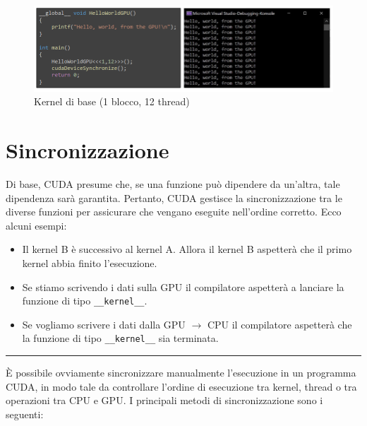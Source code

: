 \documentclass[12pt,a4paper]{report}
\begin{document}
\begin{figure}[h]
    \includegraphics[width=1\linewidth]{img/basic_kernel.png}
    \caption{Kernel di base (1 blocco, 12 thread) \cite{CUDAtutorial}}
\end{figure}

\section{Sincronizzazione}

Di base, CUDA presume che, se una funzione può dipendere da un'altra, tale dipendenza sarà garantita. Pertanto, CUDA gestisce la sincronizzazione tra le diverse funzioni per assicurare che vengano eseguite nell'ordine corretto.
Ecco alcuni esempi:

\begin{itemize}
    \item Il kernel B è successivo al kernel A. Allora il kernel B aspetterà che il primo kernel abbia finito l'esecuzione.
    \item Se stiamo scrivendo i dati sulla GPU il compilatore aspetterà a lanciare la funzione di tipo \texttt{\_\_kernel\_\_}.
    \item Se vogliamo scrivere i dati dalla GPU \(\rightarrow\) CPU il compilatore aspetterà che la funzione di tipo \texttt{\_\_kernel\_\_} sia terminata.
\end{itemize}

\vspace{8mm}
\hrule
\vspace{3mm}

È possibile ovviamente sincronizzare manualmente l'esecuzione in un programma CUDA, in modo tale da controllare l'ordine di esecuzione tra kernel, thread o tra operazioni tra CPU e GPU.  I principali metodi di sincronizzazione sono i seguenti:
\end{document}
